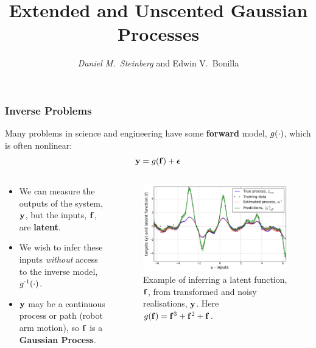 \documentclass{beamer}
\begin{document}

\title{Extended and Unscented Gaussian Processes}
\author{\textit{Daniel M.\ Steinberg} and
        Edwin V.\ Bonilla}

\date{}


\begin{frame}
    \titlepage
\end{frame}



\begin{frame}
    \frametitle{Inverse Problems}

Many problems in science and engineering have some \textbf{forward} 
model, $g\!\left({{\cdot}}\right)$, which is often nonlinear:
\begin{equation*}
    \mathbf{y} = g\!\left({{\mathbf{f}}}\right) + \boldsymbol\epsilon
\end{equation*}
\vspace{-8mm}
\begin{columns}

\begin{column}{0.5\linewidth}
\footnotesize
\vspace{-5mm}

\begin{itemize}
    \item We can measure the outputs of the system, $\mathbf{y}$, but the inputs,
        $\mathbf{f}$, are \textbf{latent}.
    \item We wish to infer these inputs \emph{without} access to the inverse
        model, $g^{\text{-}1}\!\left({{\cdot}}\right)$.
    \item $\mathbf{y}$ may be a continuous process or path (robot arm motion), 
        so $\mathbf{f}$ is a \textbf{Gaussian Process}.
\end{itemize}

\end{column}

\begin{column}{0.5\linewidth}

\begin{figure}
    \includegraphics[width=0.85\linewidth]{fig/polydemo}
    \caption{Example of inferring a latent function, $\mathbf{f}$, from
        transformed and noisy realisations, $\mathbf{y}$. Here $g\!\left({{\mathbf{f}}}\right) =
        \mathbf{f}^3 + \mathbf{f}^2 + \mathbf{f}$.}
\end{figure}


\end{column}
\end{columns}
\end{frame}
\end{document}
